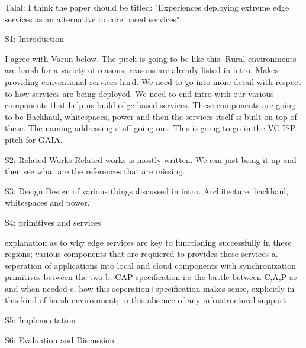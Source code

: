 Talal: I think the paper should be titled: "Experiences deploying extreme edge services as an alternative to core based services". 

S1: Introduction

I agree with Varun below. The pitch is going to be like this. Rural environments are harsh for a variety of reasons, reasons are already listed in intro. Makes providing conventional services hard. We need to go into more detail with respect to how services are being deployed. 
We need to end intro with our various components that help us build edge based services. These components are going to be Backhaul, whitespaces, power and then the services itself is built on top of these. The naming addressing stuff going out. This is going to go in the VC-ISP pitch for GAIA. 


S2: Related Works
Related works is mostly written. We can just bring it up and then see what are the references that are missing. 

S3: Design
Design of various things discussed in intro. 
Architecture, backhaul, whitespaces and power. 

S4: primitives and services

explanation as to why edge services are key to functioning successfully in these regions; various components that are requiered to provides these services
a. seperation of applications into local and cloud components with synchronization primitives between the two
b. CAP specification i.e the battle between C,A,P as and when needed
c. how this seperation+specification makes sense, explicitly in this kind of harsh environment; in this absence of any infrastructural support

S5: Implementation

S6: Evaluation and Discussion
